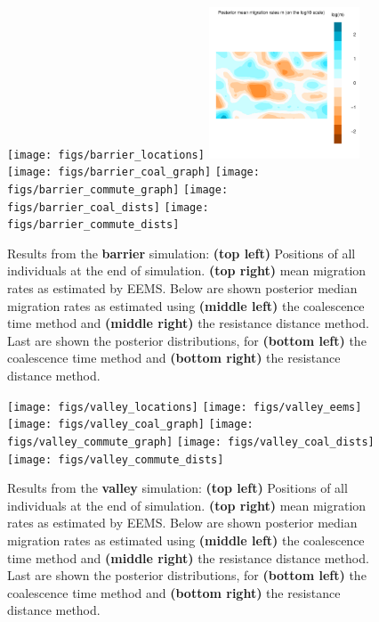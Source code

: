 \documentclass{article}
\begin{document}
\begin{figure}
\centering
    \texttt{[image: figs/barrier\_locations]}
    \includegraphics[width=0.4\textwidth]{figs/barrier_eems}
    \texttt{[image: figs/barrier\_coal\_graph]}
    \texttt{[image: figs/barrier\_commute\_graph]}
    \texttt{[image: figs/barrier\_coal\_dists]}
    \texttt{[image: figs/barrier\_commute\_dists]}
    \caption{
        Results from the \textbf{barrier} simulation:
        \textbf{(top left)} Positions of all individuals at the end of simulation.
        \textbf{(top right)} mean migration rates as estimated by EEMS.
        Below are shown
        posterior median migration rates 
            as estimated using
            \textbf{(middle left)} the coalescence time method and
            \textbf{(middle right)} the resistance distance method.
        Last are shown the posterior distributions, for
            \textbf{(bottom left)} the coalescence time method and
            \textbf{(bottom right)} the resistance distance method.
        \label{sfig:barrier_results}
    }
\end{figure}

\begin{figure}
\centering
    \texttt{[image: figs/valley\_locations]}
    \texttt{[image: figs/valley\_eems]}
    \texttt{[image: figs/valley\_coal\_graph]}
    \texttt{[image: figs/valley\_commute\_graph]}
    \texttt{[image: figs/valley\_coal\_dists]}
    \texttt{[image: figs/valley\_commute\_dists]}
    \caption{
        Results from the \textbf{valley} simulation:
        \textbf{(top left)} Positions of all individuals at the end of simulation.
        \textbf{(top right)} mean migration rates as estimated by EEMS.
        Below are shown
        posterior median migration rates 
            as estimated using 
            \textbf{(middle left)} the coalescence time method and
            \textbf{(middle right)} the resistance distance method.
        Last are shown the posterior distributions, for
            \textbf{(bottom left)} the coalescence time method and
            \textbf{(bottom right)} the resistance distance method.
        \label{sfig:valley_results}
    }
\end{figure}
\end{document}
